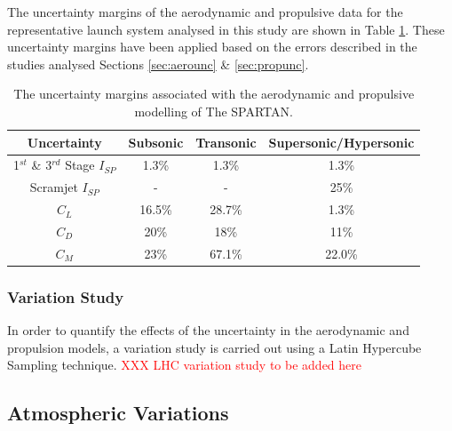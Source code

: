 The uncertainty margins of the aerodynamic and propulsive data for the representative launch system analysed in this study are shown in Table \ref{tab:AppendixUncertainty}. These uncertainty margins have been applied based on the errors described in the studies analysed Sections \ref{sec:aerounc} \& \ref{sec:propunc}. 


\begin{table}
	\centering
	\begin{tabular}{|c|c|c|c|}
		\hline  Uncertainty & Subsonic & Transonic  & Supersonic/Hypersonic \\ 
		\hline  1$^{st}$ \& 3$^{rd}$ Stage $I_{SP}$ & 1.3\% & 1.3\% &  1.3\% \\ 
		\hline  Scramjet $I_{SP}$ & - & - &  25\% \\ 
		\hline   $C_L$ & 16.5\% & 28.7\% & 1.3\% \\  
		\hline   $C_D$ & 20\% & 18\% & 11\% \\  
		\hline   $C_M$  & 23\% & 67.1\% &  22.0\% \\ 
		\hline 
	\end{tabular}
	\caption{The uncertainty margins associated with the aerodynamic and propulsive modelling of The SPARTAN.}
	\label{tab:AppendixUncertainty}
\end{table}



\subsubsection{Variation Study}
In order to quantify the effects of the uncertainty in the aerodynamic and propulsion models, a variation study is carried out using a Latin Hypercube Sampling technique. 
\textcolor{red}{XXX LHC variation study to be added here}

\subsection{Atmospheric Variations}

